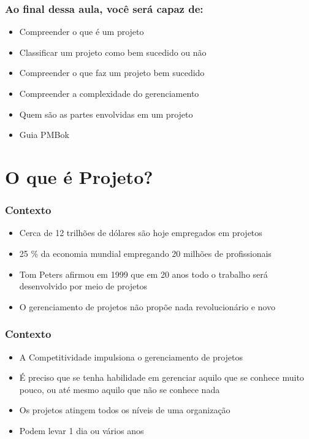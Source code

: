 \begin{frame}
\frametitle{Ao final dessa aula, você será capaz de:}
\begin{itemize}
 \item Compreender o que é um projeto
 \item Classificar um projeto como bem sucedido ou não
 \item Compreender o que faz um projeto bem sucedido
 \item Compreender a complexidade do gerenciamento
 \item Quem são as partes envolvidas em um projeto
 \item Guia PMBok
\end{itemize}
\end{frame}

\section{O que é Projeto?}

\begin{frame}
\frametitle{Contexto}
\begin{itemize}
 \item Cerca de 12 trilhões de dólares são hoje empregados em projetos
 \item  25 \% da economia mundial empregando 20 milhões de profissionais
 \item Tom Peters afirmou em 1999 que em 20 anos todo o trabalho será desenvolvido por meio de projetos
 \item O gerenciamento de projetos não propõe nada revolucionário e novo
\end{itemize}
\end{frame}

\begin{frame}
 \frametitle{Contexto}
 \begin{itemize}
  \item A Competitividade impulsiona o gerenciamento de projetos
  \item É preciso que se tenha habilidade em gerenciar aquilo que se conhece muito pouco, ou até mesmo aquilo que não se conhece nada
  \item  Os projetos atingem todos os níveis de uma organização
  \item Podem levar 1 dia ou vários anos
 \end{itemize}
\end{frame}

